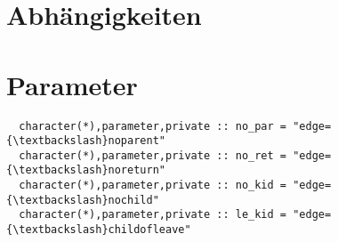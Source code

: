 \section{Abhängigkeiten}
\section{Parameter}
\begin{Verbatim}
  character(*),parameter,private :: no_par = "edge={\textbackslash}noparent"
  character(*),parameter,private :: no_ret = "edge={\textbackslash}noreturn"
  character(*),parameter,private :: no_kid = "edge={\textbackslash}nochild"
  character(*),parameter,private :: le_kid = "edge={\textbackslash}childofleave"
\end{Verbatim}

